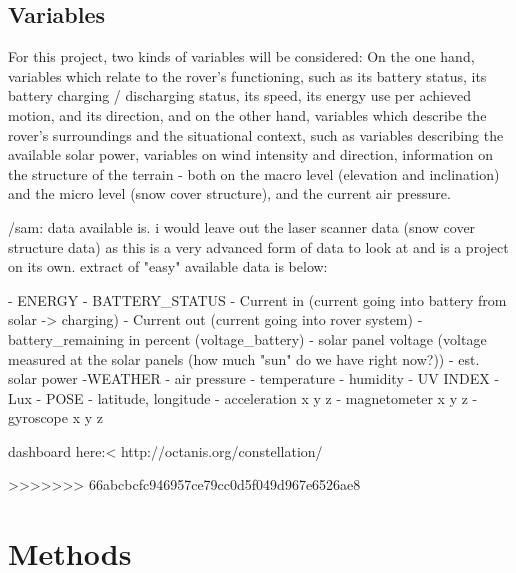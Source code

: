 \documentclass[11pt, UKenglish]{report}
\begin{document}
{\subsection*{Variables}

For this project, two kinds of variables will be considered: On the one hand, variables which relate to the rover's functioning, such as its battery status, its battery charging / discharging status, its speed, its energy use per achieved motion, and its direction, and on the other hand, variables which describe the rover's surroundings and the situational context, such as variables describing the available solar power, variables on wind intensity and direction, information on the structure of the terrain - both on the macro level (elevation and inclination) and the micro level (snow cover structure), and the current air pressure.

/sam:  data available is. i would leave out the laser scanner data (snow cover structure data) as this is a very advanced form of data to look at and is a project on its own. extract of "easy" available data is below:

- ENERGY
	- BATTERY_STATUS
		- Current in (current going into battery from solar -> charging)
		- Current out (current going into rover system)
		- battery_remaining in percent (voltage_battery)
		- solar panel voltage (voltage measured at the solar panels (how much "sun" do we have right now?))
		- est. solar power
-WEATHER
		 - air pressure
		 - temperature
		 - humidity
		- UV INDEX
		- Lux
- POSE
	- latitude, longitude
	- acceleration x y z
	- magnetometer x y z
	- gyroscope x y z

dashboard here:<
http://octanis.org/constellation/



>>>>>>> 66abcbcfc946957ce79cc0d5f049d967e6526ae8


\section*{Methods}

}
\end{document}

